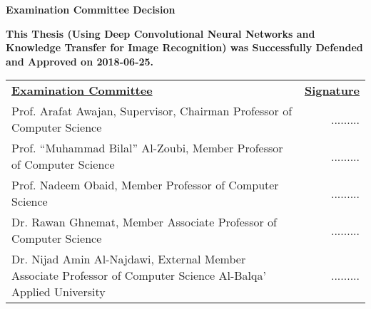 \begin{center}
\textbf{\fontsize{16pt}{24pt}\selectfont Examination Committee Decision}
\end{center}
\textbf{\fontsize{14pt}{16pt}\selectfont This Thesis (Using Deep Convolutional Neural Networks and Knowledge Transfer for Image Recognition) was Successfully Defended and Approved on 2018-06-25.}
\vspace{24pt}

\begin{table*}[!htbp]
\centering
\begin{tabularx}{\textwidth}{Xr}
\textbf{\underline{Examination Committee}} & \textbf{\underline{Signature}} \\[32pt]
Prof. Arafat Awajan, Supervisor, Chairman \newline Professor of Computer Science & ......... \\[32pt]
Prof. ``Muhammad Bilal'' Al-Zoubi, Member \newline Professor of Computer Science & ......... \\[32pt]
Prof. Nadeem Obaid, Member \newline Professor of Computer Science & ......... \\[32pt]
Dr. Rawan Ghnemat, Member \newline Associate Professor of Computer Science & ......... \\[32pt]
Dr. Nijad Amin Al-Najdawi, External Member \newline Associate Professor of Computer Science \newline Al-Balqa' Applied University  & ......... \\[32pt]
\end{tabularx}
\end{table*}

